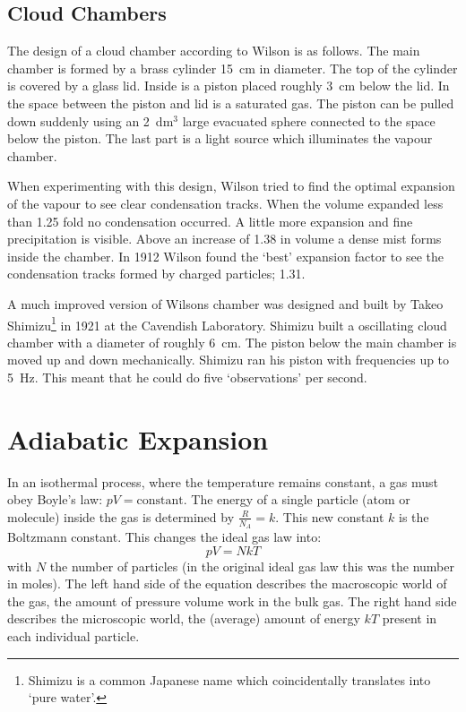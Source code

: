 \subsection{Cloud Chambers}
The design of a cloud chamber according to Wilson is as follows. The main chamber is formed by a brass cylinder 15~cm in diameter. The top of the cylinder is covered by a glass lid. Inside is a piston placed roughly 3~cm below the lid. In the space between the piston and lid is a saturated gas. The piston can be pulled down suddenly using an 2~dm$^3$ large evacuated sphere connected to the space below the piston. The last part is a light source which illuminates the vapour chamber.

When experimenting with this design, Wilson tried to find the optimal expansion of the vapour to see clear condensation tracks. When the volume expanded less than 1.25 fold no condensation occurred. A little more expansion and fine precipitation is visible. Above an increase of 1.38 in volume a dense mist forms inside the chamber. In 1912 Wilson found the `best' expansion factor to see the condensation tracks formed by charged particles; 1.31.

A much improved version of Wilsons chamber was designed and built by Takeo Shimizu\footnote{Shimizu is a common Japanese name which coincidentally translates into `pure water'.} in 1921 at the Cavendish Laboratory. Shimizu built a oscillating cloud chamber with a diameter of roughly 6~cm. The piston below the main chamber is moved up and down mechanically. Shimizu ran his piston with frequencies up to 5~Hz. This meant that he could do five `observations' per second.

\section{Adiabatic Expansion}
In an isothermal process, where the temperature remains constant, a gas must obey Boyle's law: $pV=\mbox{constant}$. The energy of a single particle (atom or molecule) inside the gas is determined by $\frac{R}{N_A}=k$. This new constant $k$ is the Boltzmann constant. This changes the ideal gas law into:
\begin{equation}
pV=NkT
\end{equation}
with $N$ the number of particles (in the original ideal gas law this was the number in moles). The left hand side of the equation describes the macroscopic world of the gas, the amount of pressure volume work in the bulk gas. The right hand side describes the microscopic world, the (average) amount of energy $kT$ present in each individual particle.

